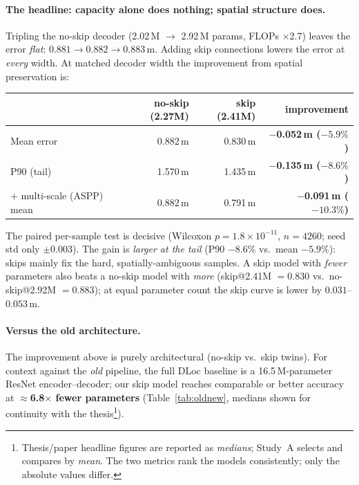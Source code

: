 \documentclass[11pt]{article}
\begin{document}
\paragraph{The headline: capacity alone does nothing; spatial structure does.}
Tripling the no-skip decoder (2.02\,M $\to$ 2.92\,M params, FLOPs $\times$2.7)
leaves the error \emph{flat}: $0.881 \to 0.882 \to 0.883$\,m. Adding skip
connections lowers the error at \emph{every} width. At matched decoder width the
improvement from spatial preservation is:

\begin{center}\small
\begin{tabular}{lrrr}
\toprule
 & no-skip (2.27M) & skip (2.41M) & improvement\\
\midrule
Mean error   & 0.882\,m & 0.830\,m & \textbf{$-$0.052\,m ($-5.9\%$)}\\
P90 (tail)   & 1.570\,m & 1.435\,m & \textbf{$-$0.135\,m ($-8.6\%$)}\\
+ multi-scale (ASPP) mean & 0.882\,m & 0.791\,m & \textbf{$-$0.091\,m ($-10.3\%$)}\\
\bottomrule
\end{tabular}
\end{center}

\noindent The paired per-sample test is decisive (Wilcoxon $p=1.8\times10^{-11}$,
$n=4260$; seed std only $\pm0.003$). The gain is \emph{larger at the tail}
(P90 $-8.6\%$ vs.\ mean $-5.9\%$): skips mainly fix the hard, spatially-ambiguous
samples. A skip model with \emph{fewer} parameters also beats a no-skip model
with \emph{more} (skip@2.41M $=0.830$ vs.\ no-skip@2.92M $=0.883$); at equal
parameter count the skip curve is lower by $0.031$--$0.053$\,m.

\paragraph{Versus the old architecture.} The improvement above is purely
architectural (no-skip vs.\ skip twins). For context against the \emph{old}
pipeline, the full DLoc baseline is a 16.5\,M-parameter ResNet encoder--decoder;
our skip model reaches comparable or better accuracy at \textbf{$\approx$6.8$\times$
fewer parameters} (Table~\ref{tab:oldnew}, medians shown for continuity with the
thesis\footnote{Thesis/paper headline figures are reported as \emph{medians};
Study~A selects and compares by \emph{mean}. The two metrics rank the models
consistently; only the absolute values differ.}).
\end{document}
